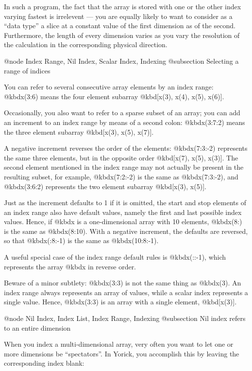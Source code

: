 In such a program, the fact that the array is stored with one or the
other index varying fastest is irrelevent --- you are equally likely to
want to consider as a ``data type'' a slice at a constant value of the
first dimension as of the second.  Furthermore, the length of every
dimension varies as you vary the resolution of the calculation in the
corresponding physical direction.



@node    Index Range, Nil Index, Scalar Index, Indexing
@subsection Selecting a range of indices

You can refer to several consecutive array elements by an index range:
@kbd{x(3:6)} means the four element subarray @kbd{[x(3), x(4), x(5),
x(6)]}.

Occasionally, you also want to refer to a sparse subset of an array; you
can add an increment to an index range by means of a second colon:
@kbd{x(3:7:2)} means the three element subarray @kbd{[x(3), x(5),
x(7)]}.

A negative increment reverses the order of the elements: @kbd{x(7:3:-2)}
represents the same three elements, but in the opposite order
@kbd{[x(7), x(5), x(3)]}.  The second element mentioned in the index
range may not actually be present in the resulting subset, for example,
@kbd{x(7:2:-2)} is the same as @kbd{x(7:3:-2)}, and @kbd{x(3:6:2)}
represents the two element subarray @kbd{[x(3), x(5)]}.

Just as the increment defaults to 1 if it is omitted, the start and stop
elements of an index range also have default values, namely the first
and last possible index values.  Hence, if @kbd{x} is a one-dimensional
array with 10 elements, @kbd{x(8:)} is the same as @kbd{x(8:10)}.  With
a negative increment, the defaults are reversed, so that @kbd{x(:8:-1)}
is the same as @kbd{x(10:8:-1)}.

A useful special case of the index range default rules is @kbd{x(::-1)},
which represents the array @kbd{x} in reverse order.

Beware of a minor subtlety: @kbd{x(3:3)} is not the same thing as
@kbd{x(3)}.  An index range always represents an array of values, while
a scalar index represents a single value.  Hence, @kbd{x(3:3)} is an
array with a single element, @kbd{[x(3)]}.



@node    Nil Index, Index List, Index Range, Indexing
@subsection Nil index refers to an entire dimension

When you index a multi-dimensional array, very often you want to let
one or more dimensions be ``spectators''.  In Yorick, you accomplish this
by leaving the corresponding index blank:

